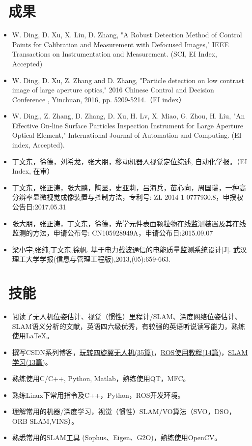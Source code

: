 \documentclass{resume}
\begin{document}
\section{\faCogs\ 成果}
\begin{itemize}\small
  \item {\color{red}W. Ding}, D. Xu, X. Liu, D. Zhang, "A Robust Detection Method of Control Points for Calibration and Measurement with Defocused Images," IEEE Transactions on Instrumentation and Measurement. (SCI, EI Index, Accepted)
  \item {\color{red}W. Ding}, D. Xu, Z. Zhang and D. Zhang, "Particle detection on low contrast image of large aperture optics," 2016 Chinese Control and Decision Conference , Yinchuan, 2016, pp. 5209-5214.（EI index）
  \item {\color{red}W. Ding},, Z. Zhang, D. Zhang, D. Xu, H. Lv, X. Miao, G. Zhou, H. Liu, "An Effective On-line Surface Particles Inspection Instrument for Large Aperture Optical Element," International Journal of Automation and Computing. (EI index, Accepted).
  \item {\color{red}丁文东}，徐德，刘希龙，张大朋，移动机器人视觉定位综述, 自动化学报。（EI Index, 在审）
  \item {\color{red}丁文东}，张正涛，张大鹏，陶显，史亚莉，吕海兵，苗心向，周国瑞，一种高分辨率显微视觉成像装置与控制方法，专利号: ZL 2014 1 0777930.8，申授权公告日:2017.05.31
  \item 张大朋，张正涛，{\color{red}丁文东}，徐德，光学元件表面颗粒物在线监测装置及其在线监测的方法，申请公布号: CN105928949A，申请公布日:2015.09.07
  \item 梁小宇,张纯,{\color{red}丁文东},徐帆. 基于电力载波通信的电能质量监测系统设计[J]. 武汉理工大学学报(信息与管理工程版),2013,(05):659-663.
\end{itemize}
\section{\faCogs\ 技能}
\begin{itemize}\small
\item 阅读了无人机位姿估计、视觉（惯性）里程计/SLAM、深度网络位姿估计、SLAM语义分析的文献，英语四六级优秀，有较强的英语听说读写能力，熟练使用LaTeX。
\item 撰写CSDN系列博客，\href{http://blog.csdn.net/wendox/article/category/6026381}{玩转四旋翼无人机(35篇)}，\href{http://blog.csdn.net/wendox/article/category/6390089}{ROS使用教程(14篇)}，\href{http://blog.csdn.net/wendox/article/category/6555599}{SLAM学习(13篇)}。
\item 熟练使用C/C++, Python, Matlab，熟练使用QT，MFC。
\item 熟练Linux下常用指令及C++，Python，ROS开发环境。
\item 理解常用的机器/深度学习，视觉（惯性）SLAM/VO算法（SVO，DSO，ORB SLAM,VINS）。
\item 熟悉常用的SLAM工具 (Sophus、Eigen、G2O)，熟练使用OpenCV。
\end{itemize}
\end{document}
